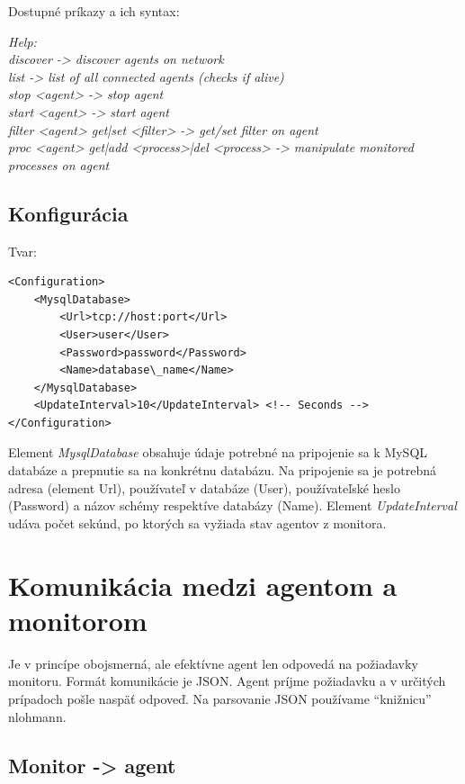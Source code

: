\documentclass[a4paper,12pt]{article}
\begin{document}
\noindent Dostupné príkazy a ich syntax:

\noindent \textit{Help: \\
discover -> discover agents on network \\
list -> list of all connected agents (checks if alive) \\
stop <agent> -> stop agent \\
start <agent> -> start agent \\
filter <agent> get|set <filter> -> get/set filter on agent \\
proc <agent> get|add <process>|del <process> -> manipulate monitored processes on agent} \\

\subsection{Konfigurácia}

Tvar: \\ 

\begin{lstlisting}
<Configuration> 
	<MysqlDatabase> 
		<Url>tcp://host:port</Url> 
		<User>user</User> 
		<Password>password</Password> 
		<Name>database\_name</Name> 
	</MysqlDatabase> 
	<UpdateInterval>10</UpdateInterval> <!-- Seconds --> 
</Configuration> 
\end{lstlisting}

Element \textit{MysqlDatabase} obsahuje údaje potrebné na pripojenie sa k MySQL databáze a prepnutie sa na konkrétnu databázu. Na pripojenie sa je potrebná adresa (element Url), používateľ v databáze (User), používateľské heslo (Password) a názov schémy respektíve databázy (Name). Element \textit{UpdateInterval} udáva počet sekúnd, po ktorých sa vyžiada stav agentov z monitora. \\
\newpage

\section{Komunikácia medzi agentom a monitorom}
Je v princípe obojsmerná, ale efektívne agent len odpovedá na požiadavky monitoru. Formát komunikácie je JSON. Agent príjme požiadavku a v určitých prípadoch pošle naspäť odpoveď. Na parsovanie JSON používame “knižnicu” nlohmann.

\subsection{Monitor -> agent}
\end{document}
